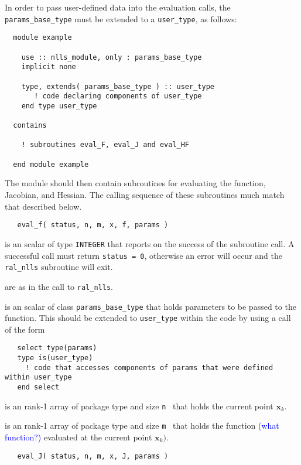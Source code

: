 \documentclass{hslspec}
\newcommand{\scalarintegerio}{is an \intentout scalar of type {\tt INTEGER} }
\newcommand{\ronearrayrealii}[1]{is an \intentin rank-1 array of package type and size {\tt #1}\ }
\newcommand{\ronearrayrealio}[1]{is an \intentout rank-1 array of package type and size {\tt #1}\ }
\begin{document}
In order to pass user-defined data into the evaluation calls, the {\tt params\_base\_type} must be extended to a {\tt user\_type}, as follows:
\begin{verbatim}
  module example

    use :: nlls_module, only : params_base_type
    implicit none

    type, extends( params_base_type ) :: user_type
       ! code declaring components of user_type 
    end type user_type
  
  contains 

    ! subroutines eval_F, eval_J and eval_HF

  end module example
\end{verbatim}
The module should then contain subroutines for evaluating the function, Jacobian, and Hessian.
The calling sequence of these subroutines much match that described below.

\begin{verbatim}
   eval_f( status, n, m, x, f, params )
\end{verbatim}

\begin{description}
   \scalarintegerio that reports on the success of the subroutine call.  
  A successful call must return {\tt status = 0}, otherwise an error will occur and the 
  {\tt ral\_nlls} subroutine will  exit.

   are as in the call to {\tt ral\_nlls}.

   is an \intentin scalar of class {\tt params\_base\_type} that holds parameters to be passed to the function.  This should be extended to {\tt user\_type} within the code by using a call of the form
\begin{verbatim}
   select type(params)
   type is(user_type)
     ! code that accesses components of params that were defined within user_type 
   end select
\end{verbatim}

   \ronearrayrealii{n} that holds the current point ${\bm x}_k$.
  
   \ronearrayrealio{m} that holds the function \textcolor{blue}{(what function?)}
  evaluated at the current point ${\bm x}_k)$.
  
\end{description}

\begin{verbatim}
   eval_J( status, n, m, x, J, params )
\end{verbatim}
\end{document}
